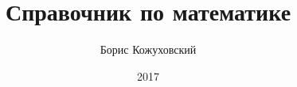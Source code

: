 \documentclass[a4paper,12pt]{report}
\begin{document}
\author{Борис Кожуховский}
\title{Справочник по математике}
\date{2017}

\maketitle
\tableofcontents














\end{document}
